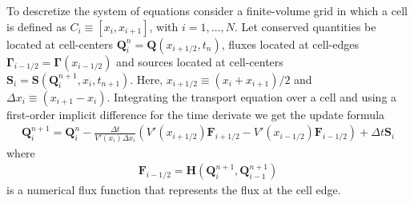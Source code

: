 \documentclass[11pt]{article}
\newcommand{\mvec}[1]{\mathbf{#1}}
\newcommand{\gvec}[1]{\boldsymbol{#1}}
\begin{document}
To descretize the system of equations consider a finite-volume grid in
which a cell is defined as $C_i \equiv [x_i, x_{i+1}]$, with
$i=1,\ldots,N$.  Let conserved quantities be located at cell-centers
$\mvec{Q}_i^n = \mvec{Q}(x_{i+1/2},t_n)$, fluxes located at cell-edges
$\gvec{\Gamma}_{i-1/2} = \gvec{\Gamma}(x_{i-1/2})$ and sources located
at cell-centers $\mvec{S}_i = \mvec{S}(\mvec{Q}_i^{n+1},
x_i,t_{n+1})$. Here, $x_{i+1/2} \equiv (x_i+x_{i+1})/2$ and $\Delta
x_i \equiv (x_{i+1}-x_i)$. Integrating the transport equation over a
cell and using a first-order implicit difference for the time derivate
we get the update formula
\begin{align}
  \mvec{Q}_i^{n+1} = \mvec{Q}^n_i - \frac{\Delta t}{V'(x_i) \Delta x_i}
  \left (
    V'(x_{i+1/2}) \mvec{F}_{i+1/2} - 
    V'(x_{i-1/2}) \mvec{F}_{i-1/2}
  \right)
  +
  \Delta t \mvec{S}_i \label{eqn:update-form}
\end{align}
where
\begin{align}
  \mvec{F}_{i-1/2} = 
  \mvec{H}(
  \mvec{Q}_i^{n+1},
  \mvec{Q}_{i-1}^{n+1}
  ) \label{eqn:flux-func}
\end{align}
is a numerical flux function that represents the flux at the cell edge.
\end{document}

